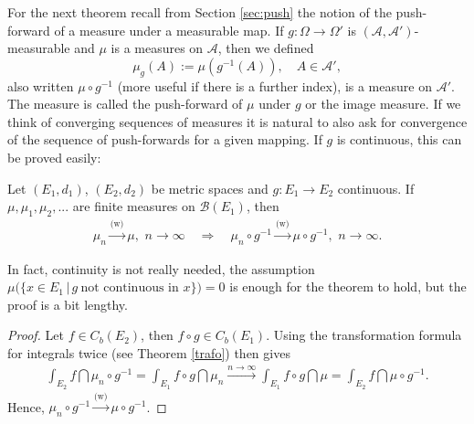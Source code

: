 For the next theorem recall from Section \ref{sec:push} the notion of the push-forward of a measure under a measurable map. If $g:\Omega \rightarrow \Omega'$ is $(\mathcal A, \mathcal A')$-measurable and $\mu$ is a measures on $\mathcal A$, then we defined $$\mu_g(A):=\mu(g^{-1}(A)),\quad A\in \mathcal A',$$ also written $\mu\circ g^{-1}$ (more useful if there is a further index), is a measure on $\mathcal A'$. The measure is called the push-forward of $\mu$ under $g$ or the image measure. If we think of converging sequences of measures it is natural to also ask for convergence of the sequence of push-forwards for a given mapping. If $g$ is continuous, this can be proved easily:
\begin{lsatz}
\begin{theorem}
	Let $(E_1,d_1)$, $(E_2,d_2)$ be metric spaces and $g\colon E_1 \to E_2$ continuous.
	If $\mu,\mu_1,\mu_2,...$ are finite measures on $\mathcal B(E_1)$, then
	\begin{align*}
		 \mu_n \overset{\text{(w)}}{\rightarrow} \mu,\,\, n\to\infty\quad \Longrightarrow \quad   \mu_n\circ g^{-1} \overset{\text{(w)}}{\rightarrow} \mu\circ g^{-1},\,\, n\to\infty.
	\end{align*}
\end{theorem}
\end{lsatz}
In fact, continuity is not really needed, the assumption $\mu\big( \{ x\in E_1 \,|\, g \:\text{not continuous in }x \}\big) = 0$ is enough for the theorem to hold, but the proof is a bit lengthy.
\begin{proof}[Proof]
 Let $f\in C_b(E_2)$, then $f\circ g \in C_b(E_1)$. Using the transformation formula for integrals twice (see Theorem \ref{trafo}) then gives
\begin{align*}
	\int_{E_2}f\dint \mu_n \circ g^{-1} = \int_{E_1} f\circ g \dint \mu_n \overset{n\to\infty}{\longrightarrow} \int_{E_1}f\circ g \dint \mu  = \int_{E_2} f\dint \mu \circ g^{-1}.
\end{align*}
Hence, $\mu_n \circ g^{-1} \overset{\text{(w)}}{\rightarrow} \mu \circ g^{-1}$.
\end{proof}
